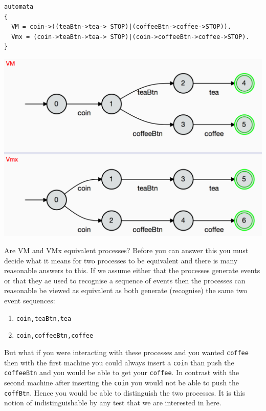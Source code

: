 \documentclass[]{article}
\begin{document}
\noindent\begin{center}
\begin{minipage}{0.8\textwidth}
\begin{center}\begin{verbatim}
automata 
{
  VM = coin->((teaBtn->tea-> STOP)|(coffeeBtn->coffee->STOP)).
  Vmx = (coin->teaBtn->tea-> STOP)|(coin->coffeeBtn->coffee->STOP).
}
\end{verbatim} 
\includegraphics[scale=0.4]{ND.png}
\end{center}\end{minipage}

\end{center}

Are  {\sf VM}  and {\sf VMx}  equivalent processes?  Before you can answer this you must decide what  it means for two processes to be equivalent and there is many reasonable answers to this. If we assume either that the processes generate events or that they ae used to recognise a sequence of events then the processes can reasonable be viewed as equivalent as both generate (recognise) the same two event sequences:
\begin{enumerate}
\item \verb|coin,teaBtn,tea|
\item \verb|coin,coffeeBtn,coffee|
\end{enumerate}

But what if you were interacting with these processes and you wanted \verb|coffee| then  with the first machine you could always insert a \verb|coin| than push the \verb|coffeeBtn| and you would be able to get your \verb|coffee|. In contrast with the second machine after inserting the \verb|coin| you would not be able to push the \verb|coffBtn|. Hence you would be able to distinguish the two processes. It is this notion of indistinguishable by any test that we are interested in here.
\end{document}
